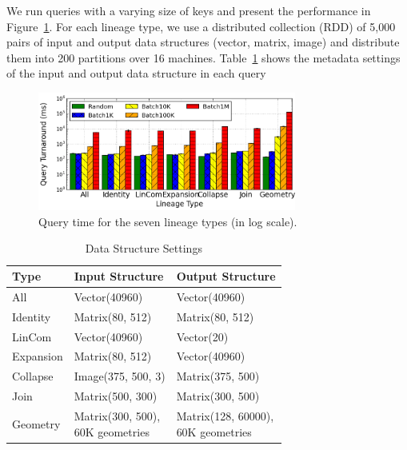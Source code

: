 \documentclass{sig-alternate}
\begin{document}
We run queries with a varying size of keys and present the performance in Figure~\ref{fig:typequery}. 
For each lineage type, we use a distributed collection (RDD) of 5,000 pairs of 
input and output data structures (vector, matrix, image) and distribute them into 200 partitions over 16 machines.
Table~\ref{tb:typequery-stats} shows the metadata settings of the input and output data structure in each query

\begin{figure}[t]
\begin{center}
    \includegraphics[width=85mm]{pictures/TypeQuery-Time}
\caption {Query time for the seven lineage types (in log scale).
    \label{fig:typequery}
}
\end{center}
\end{figure}

\begin{table}[t]
\begin{center}
    \caption{Data Structure Settings}
    \begin{scriptsize}
    \begin{tabular}{ | p{1.5cm} | p{3cm} | p{3cm} |}
    \hline
    Type & Input Structure & Output Structure \\ \hline \hline
    All & Vector(40960) & Vector(40960) \\ \hline
    Identity & Matrix(80, 512) & Matrix(80, 512) \\ \hline
    LinCom & Vector(40960) & Vector(20) \\ \hline
    Expansion & Matrix(80, 512) & Vector(40960) \\ \hline
    Collapse & Image(375, 500, 3) & Matrix(375, 500) \\ \hline
    Join & Matrix(500, 300) & Matrix(300, 500) \\ \hline
    Geometry& \shortstack[l]{Matrix(300, 500), \\60K geometries} &  \shortstack[l]{Matrix(128, 60000), \\60K geometries} \\ \hline
    \end{tabular}
    \end{scriptsize}
    \label{tb:typequery-stats}
\end{center}   
\end{table}
\end{document}
